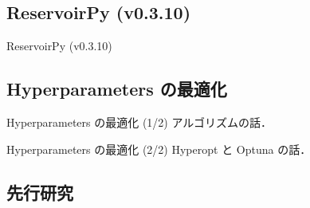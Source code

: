 \subsection{ReservoirPy (v0.3.10)}
\begin{frame}{ReservoirPy (v0.3.10)}

\end{frame}


\subsection{Hyperparameters の最適化}

\begin{frame}{Hyperparameters の最適化 (1/2)}
    アルゴリズムの話．
\end{frame}

\begin{frame}{Hyperparameters の最適化 (2/2)}
    Hyperopt と Optuna の話．
\end{frame}

\subsection{先行研究}  



